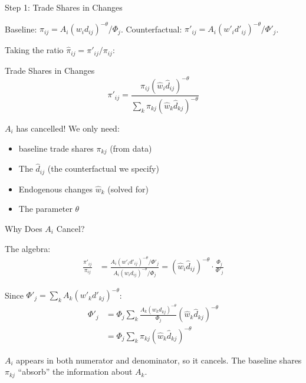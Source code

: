 \documentclass{beamer}
\begin{document}
\begin{frame}{Step 1: Trade Shares in Changes}

    Baseline: $\pi_{ij} = A_i (w_i d_{ij})^{-\theta}/\Phi_j$. \quad
    Counterfactual: $\pi'_{ij} = A_i (w'_i d'_{ij})^{-\theta}/\Phi'_j$.

    \vspace{0.2em}
    Taking the ratio $\hat{\pi}_{ij} = \pi'_{ij} / \pi_{ij}$:

    \vspace{0.2em}
    \begin{block}{Trade Shares in Changes}
        \vspace{-0.5em}
        \[ \pi'_{ij} = \frac{\pi_{ij} (\hat{w}_i \hat{d}_{ij})^{-\theta}}{\displaystyle\sum_{k} \pi_{kj} (\hat{w}_k \hat{d}_{kj})^{-\theta}} \]
    \end{block}

    \vspace{0.2em}
     $A_i$ has cancelled! We only need:
    \begin{itemize}
        \item {} baseline trade shares $\pi_{kj}$ (from data)
        \item The  $\hat{d}_{ij}$ (the counterfactual we specify)
        \item Endogenous changes $\hat{w}_k$ (solved for)
        \item The parameter $\theta$
    \end{itemize}

\end{frame}

\begin{frame}{Why Does $A_i$ Cancel?}

    {\small
    The algebra:
    \begin{align*}
        \frac{\pi'_{ij}}{\pi_{ij}} &= \frac{A_i(w'_i d'_{ij})^{-\theta}/\Phi'_j}{A_i(w_i d_{ij})^{-\theta}/\Phi_j} = (\hat{w}_i \hat{d}_{ij})^{-\theta} \cdot \frac{\Phi_j}{\Phi'_j}
    \end{align*}
    }

    \vspace{-0.5em}
    Since $\Phi'_j = \sum_k A_k(w'_k d'_{kj})^{-\theta}$:
    {\small
    \begin{align*}
        \Phi'_j &= \Phi_j \sum_k \frac{A_k(w_k d_{kj})^{-\theta}}{\Phi_j} (\hat{w}_k \hat{d}_{kj})^{-\theta} \\
        &= \Phi_j \sum_k \pi_{kj} (\hat{w}_k \hat{d}_{kj})^{-\theta}
    \end{align*}
    }

    \vspace{0.2em}
     $A_i$ appears in both numerator and denominator, so it cancels. The baseline shares $\pi_{kj}$ ``absorb'' the information about $A_k$.

\end{frame}
\end{document}
